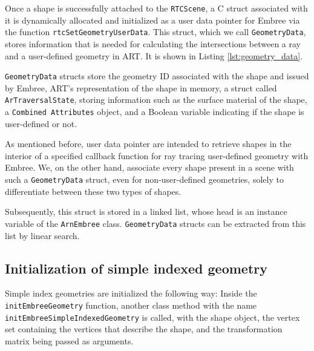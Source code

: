 Once a shape is successfully attached to the \texttt{RTCScene}, a C struct associated with it is dynamically allocated and initialized as a user data pointer for Embree via the function \texttt{rtcSetGeometryUserData}. This struct, which we call \texttt{GeometryData}, stores information that is needed for calculating the intersections between a ray and a user-defined geometry in ART. It is shown in Listing \ref{lst:geometry_data}.

\texttt{GeometryData} structs store the geometry ID associated with the shape and issued by Embree, ART's representation of the shape in memory, a struct called  \texttt{ArTraversalState}, storing information such as the surface material of the shape, a \texttt{Combined Attributes} object, and a Boolean variable indicating if the shape is user-defined or not.


As mentioned before, user data pointer are intended to retrieve shapes in the interior of a specified callback function for ray tracing user-defined geometry with Embree. We, on the other hand, associate every shape present in a scene with such a \texttt{GeometryData} struct, even for non-user-defined geometries, solely to differentiate between these two types of shapes.
 
Subsequently, this struct is stored in a linked list, whose head is an instance variable of the \texttt{ArnEmbree} class. \texttt{GeometryData} structs can be extracted from this list by linear search. 

\subsection{Initialization of simple indexed geometry}
Simple index geometries are initialized the following way: Inside the \texttt{initEmbreeGeometry} function, another class method with the name \texttt{initEmbreeSimpleIndexedGeometry} is called, with the shape object, the vertex set containing the vertices that describe the shape, and the transformation matrix being passed as arguments. 
\\


